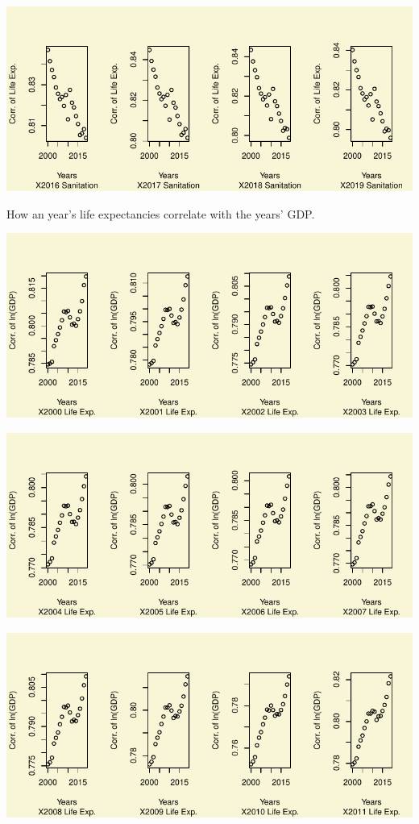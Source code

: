\documentclass[
]{article}
\begin{document}
\includegraphics{main_files/figure-pdf/unnamed-chunk-28-5.pdf}

How an year's life expectancies correlate with the years' GDP.

\includegraphics{main_files/figure-pdf/unnamed-chunk-29-1.pdf}

\includegraphics{main_files/figure-pdf/unnamed-chunk-29-2.pdf}

\includegraphics{main_files/figure-pdf/unnamed-chunk-29-3.pdf}
\end{document}
